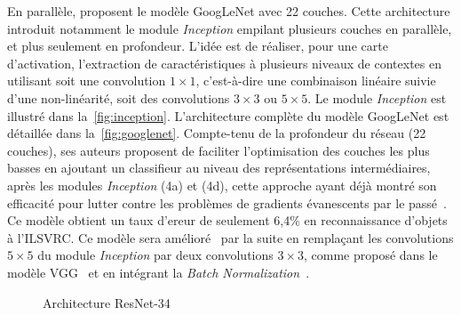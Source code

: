 En parallèle, \citet{szegedy_going_2015} proposent le modèle GoogLeNet avec 22 couches. Cette architecture introduit notamment le module \emph{Inception} empilant plusieurs couches en parallèle, et plus seulement en profondeur. L'idée est de réaliser, pour une carte d'activation, l'extraction de caractéristiques à plusieurs niveaux de contextes en utilisant soit une convolution $1\times1$, c'est-à-dire une combinaison linéaire suivie d'une non-linéarité, soit des convolutions $3\times3$ ou $5\times5$. Le module \emph{Inception} est illustré dans la~\cref{fig:inception}. L'architecture complète du modèle GoogLeNet est détaillée dans la~\cref{fig:googlenet}. Compte-tenu de la profondeur du réseau (22 couches), ses auteurs proposent de faciliter l'optimisation des couches les plus basses en ajoutant un classifieur au niveau des représentations intermédiaires, après les modules \emph{Inception} (4a) et (4d), cette approche ayant déjà montré son efficacité pour lutter contre les problèmes de gradients évanescents par le passé~\cite{lee_deeply-supervised_2015}. Ce modèle obtient un taux d'ereur de seulement 6,4\% en reconnaissance d'objets à l'\gls{ILSVRC}. Ce modèle sera amélioré~\cite{szegedy_rethinking_2015} par la suite en remplaçant les convolutions $5\times5$ du module \emph{Inception} par deux convolutions $3\times3$, comme proposé dans le modèle VGG~\cite{simonyan_very_2014} et en intégrant la \emph{Batch Normalization}~\cite{ioffe_batch_2015}.

\begin{figure}[t]
  \resizebox{\textwidth}{!}{
    
  }
  \caption{Architecture ResNet-34~\cite{he_deep_2016}}
  \label{fig:resnet}
\end{figure}


